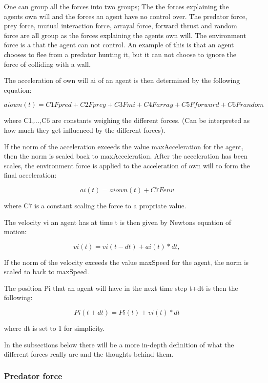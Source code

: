 \documentclass[paper=a4, fontsize=11pt,twoside]{scrartcl}		%
\begin{document}
\begin{flushleft}
One can group all the forces into two groups; The the forces explaining the agents own will and the forces an agent have no control over. The predator force, prey force, mutual interaction force, arrayal force, forward thrust and random force are all group as the forces explaining the agents own will. The environment force is a that the agent can not control. An example of this is that an agent chooses to flee from a predator hunting it, but it can not choose to ignore the force of colliding with a wall. \newline

The acceleration of own will ai of an agent is then determined by the following equation:

$$aiown(t) = C1Fpred + C2Fprey + C3Fmi + C4Farray + C5Fforward + C6Frandom$$

where C1,...,C6 are constants weighing the different forces. (Can be interpreted as how much they get influenced by the different forces). \newline

If the norm of the acceleration exceeds the value maxAcceleration for the agent, then the norm is scaled back to maxAcceleration. After the acceleration has been scales, the environment force is applied to the acceleration of own will to form the final acceleration:

$$ai(t) = aiown(t) + C7Fenv$$

where C7 is a constant scaling the force to a propriate value. \newline

The velocity vi an agent has at time t is then given by Newtons equation of motion:

$$vi(t) = vi(t-dt)+ai(t)*dt,$$

If the norm of the velocity exceeds the value maxSpeed for the agent, the norm is scaled to back to maxSpeed. \newline

The position Pi that an agent will have in the next time step t+dt is then the following:

$$Pi(t+dt) = Pi(t)+vi(t)*dt$$

where dt is set to 1 for simplicity. \newline

In the subsections below there will be a more in-depth definition of what the different forces really are and the thoughts behind them.

\subsubsection{Predator force}


\end{flushleft}
\end{document}
